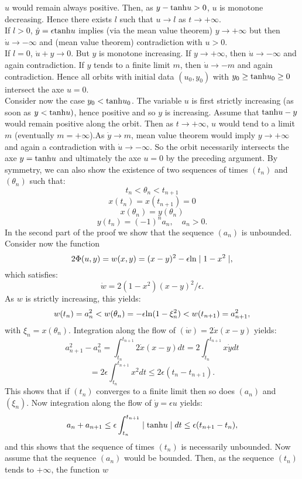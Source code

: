 \documentclass[12pt,psamsfonts]{amsart}
\begin{document}
$u$ would remain always positive. Then, as $y-{\rm tanh}u>0$, $u$ is
monotone decreasing. Hence there exists $l$ such that $u\to l$ as
$t\to+\infty$.\\
If $l>0$, $\dot{y}={\epsilon}{\rm tanh}u$ implies (via the mean
value theorem) $y\to+\infty$ but then ${\dot u}\to-\infty$ and
(mean value theorem) contradiction with $u>0$.\\
If $l=0$, $\dot{u}+y\to 0$. But $y$ is monotone increasing. If
$y\to+\infty$, then ${\dot u}\to-\infty$ and again contradiction.
If $y$ tends to a finite limit $m$, then $\dot{u}\to -m$ and again
contradiction. Hence all orbits with initial data $(u_0,y_0)$ with
$y_0\geq {\rm tanh}u_0\geq 0$ intersect the axe $u=0$.\\
Consider now the case $y_0<{\rm tanh}u_0$. The variable $u$ is first
strictly increasing (as soon as $y<{\rm tanh}u)$, hence positive and
so $y$ is increasing. Assume that ${\rm tanh}u-y$ would remain
positive along the orbit. Then as $t\to+\infty$, $u$ would tend to
a limit $m$ (eventually $m=+\infty$).As ${\dot y}\to m$, mean
value theorem would imply $y\to +\infty$ and again a contradiction
with ${\dot u}\to-\infty$. So the orbit necessarily intersects the
axe $y={\rm tanh}u$ and ultimately the axe $u=0$ by the preceding
argument. By symmetry, we can also show the existence of two
sequences of times $(t_n)$ and $(\theta_n)$ such that:
$$t_n<\theta_n<t_{n+1}$$
$$x(t_n)=x(t_{n+1})=0$$
$$x(\theta_n)=y(\theta_n)$$
$$y(t_n)=(-1)^na_n,\quad a_n>0.$$
In the second part of the proof we show that the sequence $(a_n)$ is
unbounded.\\
Consider now the function
$$2\Phi(u,y)=w(x,y)=(x-y)^2-{\epsilon}{\rm ln}\mid 1-x^2\mid,$$
which satisfies:
$$\dot{w}=2(1-x^2)(x-y)^2/\epsilon.$$
As $w$ is strictly increasing, this yields:
$$w(t_n)=a_n^2<w(\theta_n)=-{\epsilon}{\rm ln}(1-\xi_n^2)<w(t_{n+1})=a_{n+1}^2,$$
with $\xi_n=x(\theta_n).$
Integration along the flow of $(\dot w)=2\dot{x}(x-y)$ yields:
$$a_{n+1}^2-a_n^2=\int_{t_n}^{t_{n+1}}2\dot{x}(x-y)dt=2\int_{t_n}^{t_{n+1}}x\dot{y}dt$$
$$=2{\epsilon}\int_{t_n}^{t_{n+1}}x^2dt\leq 2{\epsilon}(t_{n}-t_{n+1}).$$
This shows that if $(t_n)$ converges to a finite limit then so does $(a_n)$ and
$(\xi_n)$. Now integration along the flow of $\dot{y}=\epsilon u$
yields:
$$a_n+a_{n+1}\leq {\epsilon}\int_{t_n}^{t_{n+1}}\mid {\rm tanh}u\mid dt\leq
{\epsilon}(t_{n+1}-t_n),$$
and this shows that the sequence of times $(t_n)$ is necessarily
unbounded. Now assume that the sequence $(a_n)$ would be bounded.
Then, as the sequence $(t_n)$ tends to $+\infty$, the function $w$
\end{document}
